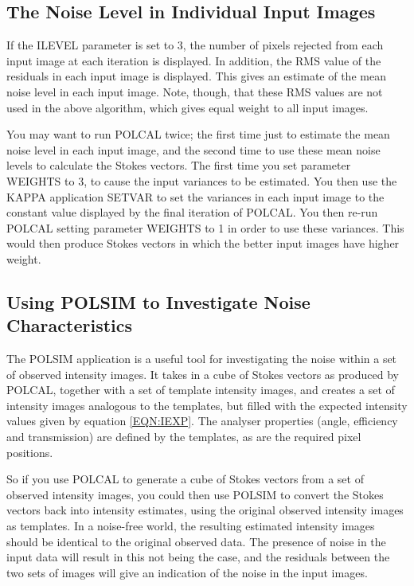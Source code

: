 \documentclass[twoside,11pt]{article}
\newcommand{\htmlref}[2]{#1}
\newcommand{\xref}[3]{#1}
\renewcommand{\_}{\texttt{\symbol{95}}}
\begin{document}
\subsection{The Noise Level in Individual Input Images}
If the ILEVEL parameter is set to 3, the number of pixels rejected from
each input image at each iteration is displayed. In addition, the RMS
value of the residuals in each input image is displayed. This gives an
estimate of the mean noise level in each input image. Note, though, that 
these RMS values are not used in the above algorithm, which gives equal
weight to all input images. 

You may want to run POLCAL twice; the first time just to estimate the mean
noise level in each input image, and the second time to use these mean
noise levels to calculate the Stokes vectors. The first time you set
parameter WEIGHTS to 3, to cause the input variances to be estimated.
You then use the KAPPA application \xref{SETVAR}{sun95}{SETVAR} 
to set the variances in each input image to the constant value
displayed by the final iteration of POLCAL. You then re-run POLCAL
setting parameter WEIGHTS to 1 in order to use these variances. This
would then produce Stokes vectors in which the better input images have
higher weight.


\subsection{Using POLSIM to Investigate Noise Characteristics}
The \htmlref{POLSIM}{POLSIM} application is a useful tool for
investigating the noise within a set of observed intensity images. It
takes in a cube of Stokes vectors as produced by \htmlref{POLCAL}{POLCAL},
together with a set of template intensity images, and creates a set of
intensity images analogous to the templates, but filled with the expected
intensity values given by equation \ref{EQN:IEXP}. The analyser properties
(angle, efficiency and transmission) are defined by the templates, as are
the required pixel positions.

So if you use POLCAL to generate a cube of Stokes vectors from a set of 
observed intensity images, you could then use POLSIM to convert the
Stokes vectors back into intensity estimates, using the original observed
intensity images as templates. In a noise-free world, the resulting
estimated intensity images should be identical to the original observed
data. The presence of noise in the input data will result in this not
being the case, and the residuals between the two sets of images will
give an indication of the noise in the input images.
\end{document}
